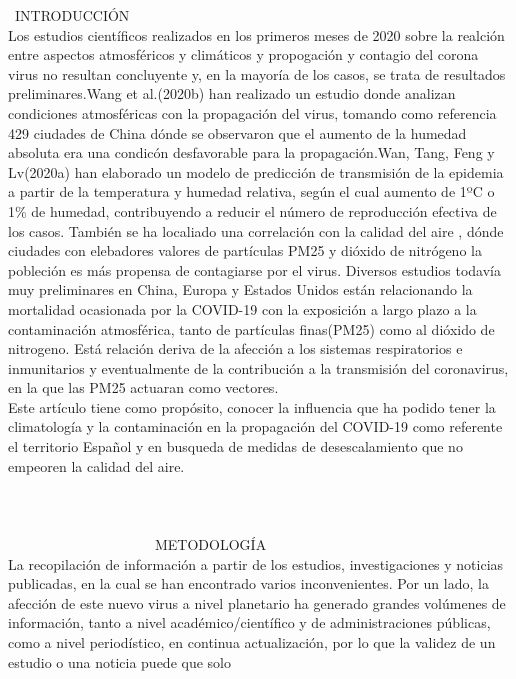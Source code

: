 \documentclass[a4paper,11pt]{article}
\begin{document}
 \ INTRODUCCIÓN
\\ Los estudios científicos realizados en los primeros meses de 2020 sobre la realción entre aspectos atmosféricos y climáticos y propogación y contagio del corona virus no resultan concluyente y, en la mayoría de los casos, se trata de resultados preliminares.Wang et al.(2020b) han realizado un estudio donde analizan condiciones atmosféricas con la propagación del virus, tomando como referencia 429 ciudades de China dónde se observaron que el aumento de la humedad absoluta era una condicón desfavorable para la propagación.Wan, Tang, Feng y Lv(2020a) han elaborado un modelo de predicción de transmisión de la epidemia a partir de la temperatura y humedad relativa, según el cual aumento de 1ºC o 1\% de humedad, contribuyendo a reducir el número de reproducción efectiva de los casos. También se ha localiado una correlación con la calidad del aire , dónde ciudades con elebadores valores de partículas PM25 y dióxido de nitrógeno la pobleción es más propensa de contagiarse por el virus.
Diversos estudios todavía muy preliminares en China, Europa y Estados Unidos están relacionando la mortalidad ocasionada por la COVID-19 con la exposición a largo plazo a la contaminación atmosférica, tanto de partículas finas(PM25) como al dióxido de nitrogeno. Está relación deriva de la afección a los sistemas respiratorios e inmunitarios y eventualmente de la contribución a la transmisión del coronavirus, en la que las PM25 actuaran como vectores.
\\ Este artículo tiene como propósito, conocer la influencia que ha podido tener la climatología y la contaminación en la propagación del COVID-19 como referente el territorio Español y en busqueda de medidas de desescalamiento que no empeoren la calidad del aire.
\ \ \ \ \ \ \ \ \ \ \ \ \ \ \   \ \ \ \ \ \ \\ \ \ \ \ \ \ \ \ \ \ \ \ \ \   \ \ \ \ \ \ \\ \ \ \ \ \ \ \ \ \ \ \ \ \ \   \ \ \ \ \ \ \\ \ \ \ \ \ \ \ \ \ \ \ \ \ \   \ \ \ \ \ \ \\ \ \ \ \ \ \ \ \ \ \ \ \ \ \   \ \ \ \ \ \ \
 METODOLOGÍA
\\La recopilación de información a partir de los estudios, investigaciones y noticias publicadas, en la cual se han encontrado varios
inconvenientes. Por un lado, la afección de este nuevo virus a nivel planetario ha generado grandes volúmenes
de información, tanto a nivel académico/científico y de administraciones públicas, como a nivel
periodístico, en continua actualización, por lo que la validez de un estudio o una noticia puede que solo
\end{document}
